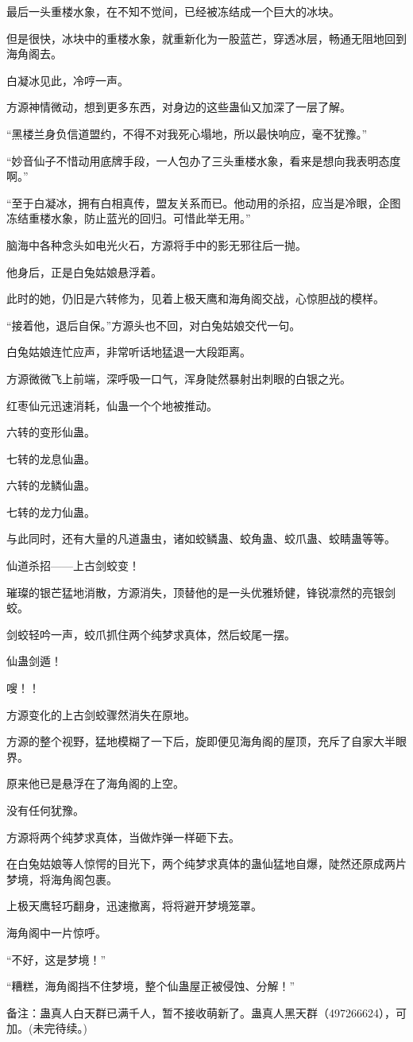 \begin{this_body}
最后一头重楼水象，在不知不觉间，已经被冻结成一个巨大的冰块。

但是很快，冰块中的重楼水象，就重新化为一股蓝芒，穿透冰层，畅通无阻地回到海角阁去。

白凝冰见此，冷哼一声。

方源神情微动，想到更多东西，对身边的这些蛊仙又加深了一层了解。

“黑楼兰身负信道盟约，不得不对我死心塌地，所以最快响应，毫不犹豫。”

“妙音仙子不惜动用底牌手段，一人包办了三头重楼水象，看来是想向我表明态度啊。”

“至于白凝冰，拥有白相真传，盟友关系而已。他动用的杀招，应当是冷眼，企图冻结重楼水象，防止蓝光的回归。可惜此举无用。”

脑海中各种念头如电光火石，方源将手中的影无邪往后一抛。

他身后，正是白兔姑娘悬浮着。

此时的她，仍旧是六转修为，见着上极天鹰和海角阁交战，心惊胆战的模样。

“接着他，退后自保。”方源头也不回，对白兔姑娘交代一句。

白兔姑娘连忙应声，非常听话地猛退一大段距离。

方源微微飞上前端，深呼吸一口气，浑身陡然暴射出刺眼的白银之光。

红枣仙元迅速消耗，仙蛊一个个地被推动。

六转的变形仙蛊。

七转的龙息仙蛊。

六转的龙鳞仙蛊。

七转的龙力仙蛊。

与此同时，还有大量的凡道蛊虫，诸如蛟鳞蛊、蛟角蛊、蛟爪蛊、蛟睛蛊等等。

仙道杀招——上古剑蛟变！

璀璨的银芒猛地消散，方源消失，顶替他的是一头优雅矫健，锋锐凛然的亮银剑蛟。

剑蛟轻吟一声，蛟爪抓住两个纯梦求真体，然后蛟尾一摆。

仙蛊剑遁！

嗖！！

方源变化的上古剑蛟骤然消失在原地。

方源的整个视野，猛地模糊了一下后，旋即便见海角阁的屋顶，充斥了自家大半眼界。

原来他已是悬浮在了海角阁的上空。

没有任何犹豫。

方源将两个纯梦求真体，当做炸弹一样砸下去。

在白兔姑娘等人惊愕的目光下，两个纯梦求真体的蛊仙猛地自爆，陡然还原成两片梦境，将海角阁包裹。

上极天鹰轻巧翻身，迅速撤离，将将避开梦境笼罩。

海角阁中一片惊呼。

“不好，这是梦境！”

“糟糕，海角阁挡不住梦境，整个仙蛊屋正被侵蚀、分解！”

备注：蛊真人白天群已满千人，暂不接收萌新了。蛊真人黑天群（497266624），可加。(未完待续。)

\end{this_body}

